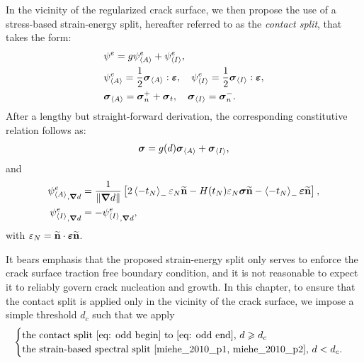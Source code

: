 In the vicinity of the regularized crack surface, we then propose the use of a stress-based strain-energy split, hereafter referred to as the \textit{contact split},
that takes the form:
\begin{subequations}
  \begin{align}
     & \psi^e = g\psi^e_{\left< A \right>} + \psi^e_{\left< I \right>} , \label{eq: odd begin}                                                            \\
     & \psi^e_{\left< A \right>} = \dfrac{1}{2}\boldsymbol{\sigma}_{\left< A \right>}:\boldsymbol{\varepsilon}, \quad \psi^e_{\left< I \right>} = \dfrac{1}{2}\boldsymbol{\sigma}_{\left< I \right>}:\boldsymbol{\varepsilon} , \\
     & \boldsymbol{\sigma}_{\left< A \right>} = \boldsymbol{\sigma}_n^+ + \boldsymbol{\sigma}_t, \quad \boldsymbol{\sigma}_{\left< I \right>} = \boldsymbol{\sigma}_n^-.                                              
  \end{align}
\end{subequations}
After a lengthy but straight-forward derivation, the corresponding constitutive relation follows as:
\begin{align}
  \boldsymbol{\sigma}  = g(d)\boldsymbol{\sigma}_{\left< A \right>} + \boldsymbol{\sigma}_{\left< I \right>} , \label{eq: odd end}
\end{align}
and
\begin{subequations}
  \begin{align}
    {\psi^e_{\left< A \right>}}_{,\boldsymbol{\nabla} d}   & = \dfrac{1}{\left\lVert\boldsymbol{\nabla} d\right\rVert} \left[ 2 \left<-t_N\right>_- \varepsilon_N \widetilde{\textbf{n}} - H(t_N) \varepsilon_N \boldsymbol{\sigma}\widetilde{\textbf{n}} - \left<-t_N\right>_- \boldsymbol{\varepsilon}\widetilde{\textbf{n}} \right], \\
    {\psi^e_{\left< I \right>}}_{,\boldsymbol{\nabla} d} & = -{\psi^e_{\left< I \right>}}_{,\boldsymbol{\nabla} d},                                                                                                                             
  \end{align}
\end{subequations}
with $\varepsilon_N = \widetilde{\textbf{n}}\cdot\boldsymbol{\varepsilon}\widetilde{\textbf{n}}$.

It bears emphasis that the proposed strain-energy split only serves to enforce the crack surface traction free boundary condition, and it is not reasonable to expect it to reliably govern crack nucleation and growth. In this chapter, to ensure that the contact split is applied only in the vicinity of the crack surface, we impose a simple threshold $d_c$ such that we apply
\begin{align*}
  \begin{cases}
    \text{the contact split \eqref{eq: odd begin} to \eqref{eq: odd end}, } d \geqslant d_c \\
    \text{the strain-based spectral split \cite{miehe_2010_p1, miehe_2010_p2}, } d < d_c.
  \end{cases}
\end{align*}

